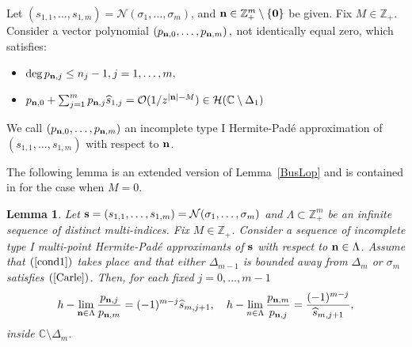 \documentclass[10pt,a4paper]{article}
\newtheorem{lemma}[theorem]{Lemma}
\theoremstyle{definition}
\theoremstyle{remark}
\numberwithin{equation}{section}
\begin{document}
Let $(s_{1,1},\ldots,s_{1,m}) = \mathcal{N}(\sigma_1,\ldots,\sigma_m)$, and ${\bf n} \in \mathbb{Z}_+^{m}  \setminus \{\bf 0\}$ be given.  Fix   $M \in \mathbb{Z}_+$. Consider a vector polynomial $\left(p_{{\bf n},0},\ldots, p_{{\bf n},m}\right),$ not  identically equal zero, which satisfies:
\begin{itemize}
\item[a')] $\deg p_{{\bf n},j} \leq n_j -1, j=1,\ldots,m,$
\item[b')] $p_{{\bf n},0} + \sum_{j= 1}^m p_{{\bf n},j} \widehat{s}_{1,j} = \mathcal{O}(1/z^{|{\bf n}| -M}) \in \mathcal{H}(\mathbb{C} \setminus \Delta_1)$
\end{itemize}
We call  $\left(p_{{\bf n},0},\ldots, p_{{\bf n},m}\right)$ an incomplete type I  Hermite-Pad\'e  approximation of $(s_{1,1},\ldots,s_{1,m})$ with respect to  $\bf n$.




The following lemma  is an extended version of Lemma~\ref{BusLop} and is   contained in \cite[Lemma 3.1]{LM}   for the case  when $M = 0$.


\begin{lemma} \label{CCTI}  Let ${\bf s}= (s_{1,1},\ldots,s_{1,m}) = \mathcal{N}(\sigma_1,\ldots,\sigma_m)$ and $\Lambda \subset \mathbb{Z}_+^{m}$ be an infinite sequence of distinct multi-indices. Fix  $M \in \mathbb{Z}_+$. Consider a sequence of incomplete type I multi-point Hermite-Pad\'e approximants of ${\bf s}$ with respect to ${{\bf n} \in \Lambda}$.
Assume that $(\ref{cond1})$ takes place and that either $\Delta_{m-1}$ is bounded away from $\Delta_m$ or $\sigma_m$ satisfies $(\ref{Carle})$. Then,
for each fixed $j=0,\ldots,m-1$
\begin{equation} \label{convHaus}
h-\lim_{{\bf n}\in \Lambda}\frac{p_{{\bf n}, j}}{p_{{\bf n},m}} = (-1)^{m-j}\widehat{s}_{m,j+1}, \quad h-\lim_{n\in \Lambda}\frac{p_{{\bf n}, m}}{p_{{\bf n},j}} = \frac{(-1)^{m-j}}{\widehat{s}_{m,j+1} },
\end{equation}
inside $\mathbb{C} \setminus \Delta_m$.
\end{lemma}
\end{document}
